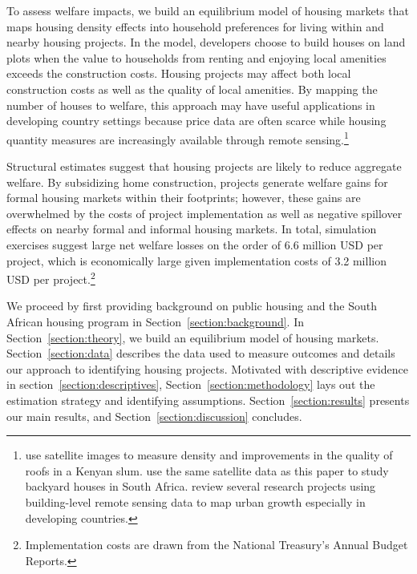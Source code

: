 \documentclass[12pt]{article}
\begin{document}
To assess welfare impacts, we build an equilibrium model of housing markets that maps housing density effects into household preferences for living within and nearby housing projects.  In the model, developers choose to build houses on land plots when the value to households from renting and enjoying local amenities exceeds the construction costs.  Housing projects may affect both local construction costs as well as the quality of local amenities.  By mapping the number of houses to welfare, this approach may have useful applications in developing country settings because price data are often scarce while housing quantity measures are increasingly available through remote sensing.\footnote{ \cite{marxthere} use satellite images to measure density and improvements in the quality of roofs in a Kenyan slum.  \cite{Brueckner2018backyarding} use the same satellite data as this paper to study backyard houses in South Africa. \cite{donaldson2016view} review several research projects using building-level remote sensing data to map urban growth especially in developing countries. }  

Structural estimates suggest that housing projects are likely to reduce aggregate welfare.  By subsidizing home construction, projects generate welfare gains for formal housing markets within their footprints; however, these gains are overwhelmed by the costs of project implementation as well as negative spillover effects on nearby formal and informal housing markets.  In total, simulation exercises suggest large net welfare losses on the order of 6.6 million USD per project, which is economically large given implementation costs of 3.2 million USD per project.\footnote{Implementation costs are drawn from the National Treasury's Annual Budget Reports.}  


We proceed by first providing background on public housing and the South African housing program in Section~\ref{section:background}.  In Section~\ref{section:theory}, we build an equilibrium model of housing markets.  Section~\ref{section:data} describes the data used to measure outcomes and details our approach to identifying housing projects. Motivated with descriptive evidence in section~\ref{section:descriptives}, Section~\ref{section:methodology} lays out the estimation strategy and identifying assumptions. Section~\ref{section:results} presents our main results, and  Section~\ref{section:discussion} concludes.
\end{document}
